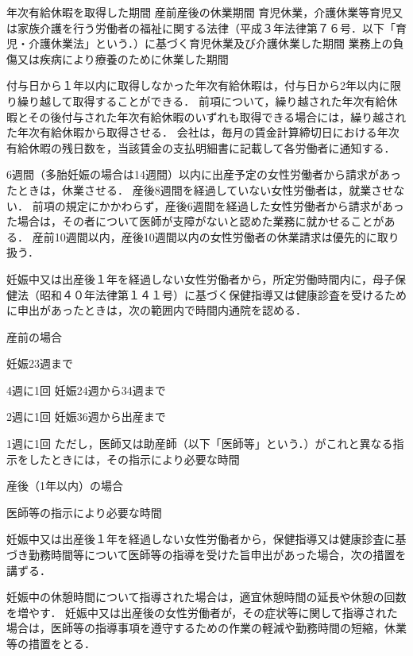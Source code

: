 \documentclass[11pt,a4paper]{jsarticle}
\begin{document}
\begin{enumerate}
	\itm 年次有給休暇を取得した期間
	\itm 産前産後の休業期間
	\itm 育児休業，介護休業等育児又は家族介護を行う労働者の福祉に関する法律（平成３年法律第７６号．以下「育児・介護休業法」という．）に基づく育児休業及び介護休業した期間
	\itm 業務上の負傷又は疾病により療養のために休業した期間
\end{enumerate}
\term
付与日から１年以内に取得しなかった年次有給休暇は，付与日から2年以内に限り繰り越して取得することができる．
\term
前項について，繰り越された年次有給休暇とその後付与された年次有給休暇のいずれも取得できる場合には，繰り越された年次有給休暇から取得させる．
\term
会社は，毎月の賃金計算締切日における年次有給休暇の残日数を，当該賃金の支払明細書に記載して各労働者に通知する．

6週間（多胎妊娠の場合は14週間）以内に出産予定の女性労働者から請求があったときは，休業させる．
\term
産後8週間を経過していない女性労働者は，就業させない．
\term
前項の規定にかかわらず，産後6週間を経過した女性労働者から請求があった場合は，その者について医師が支障がないと認めた業務に就かせることがある．
\term
産前10週間以内，産後10週間以内の女性労働者の休業請求は優先的に取り扱う． 

妊娠中又は出産後１年を経過しない女性労働者から，所定労働時間内に，母子保健法（昭和４０年法律第１４１号）に基づく保健指導又は健康診査を受けるために申出があったときは，次の範囲内で時間内通院を認める．
\begin{enumerate}
	\itm 産前の場合
	\begin{enumerate}
		\itm 妊娠23週まで\par 4週に1回
		\itm 妊娠24週から34週まで\par 2週に1回
		\itm 妊娠36週から出産まで\par 1週に1回
		\itm ただし，医師又は助産師（以下「医師等」という．）がこれと異なる指示をしたときには，その指示により必要な時間
	\end{enumerate}
	\itm 産後（1年以内）の場合
	\begin{enumerate}
		\itm 医師等の指示により必要な時間
	\end{enumerate}
\end{enumerate}

\term
妊娠中又は出産後１年を経過しない女性労働者から，保健指導又は健康診査に基づき勤務時間等について医師等の指導を受けた旨申出があった場合，次の措置を講ずる．
\begin{enumerate}
	\itm 妊娠中の休憩時間について指導された場合は，適宜休憩時間の延長や休憩の回数を増やす．
	\itm 妊娠中又は出産後の女性労働者が，その症状等に関して指導された場合は，医師等の指導事項を遵守するための作業の軽減や勤務時間の短縮，休業等の措置をとる．
\end{enumerate}
\end{document}
